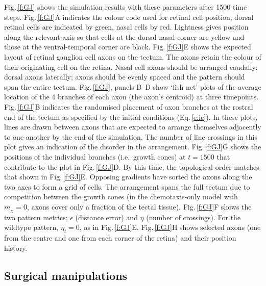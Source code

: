 \documentclass[11pt, a4paper]{article}
\begin{document}
Fig.\,\ref{f:GJ} shows the simulation results with these parameters after 1500 time steps. 
Fig.\,\ref{f:GJ}A indicates the colour code used for retinal cell position; dorsal retinal cells are indicated by green, nasal cells by red. Lightness gives position along the relevant axis so that cells at the dorsal-nasal corner are yellow and those at the ventral-temporal corner are black.
Fig.\,\ref{f:GJ}E shows the expected layout of retinal ganglion cell axons on the tectum.
The axons retain the colour of their originating cell on the retina.
Nasal cell axons should be arranged caudally; dorsal axons laterally; axons should be evenly spaced and the pattern should span the entire tectum.
Fig.\,\ref{f:GJ}, panels B--D show `fish net' plots of the average location of the 4 branches of each axon (the axon's centroid) at three timepoints. 
Fig.\,\ref{f:GJ}B indicates the randomised placement of axon branches at the rostral end of the tectum as specified by the initial conditions (Eq.\,\ref{e:ic}).
In these plots, lines are drawn between axons that are expected to arrange themselves adjacently to one another by the end of the simulation. 
The number of line crossings in this plot gives an indication of the disorder in the arrangement.
Fig.\,\ref{f:GJ}G shows the positions of the individual branches (i.e.~growth cones) at $t=1500$ that contribute to the plot in Fig.\,\ref{f:GJ}D.
By this time, the topological order matches that shown in Fig.\,\ref{f:GJ}E.
Opposing gradients have sorted the axons along the two axes to form a grid of cells.
The arrangement spans the full tectum due to competition between the growth cones (in the chemotaxis-only model with $m_{\!_X}=0$, axons cover only a fraction of the tectal tissue).
Fig.\,\ref{f:GJ}F shows the two pattern metrics; $\epsilon$ (distance error) and $\eta$ (number of crossings).
For the wildtype pattern, $\eta_t=0$, as in Fig.\,\ref{f:GJ}E. 
Fig.\,\ref{f:GJ}H shows selected axons (one from the centre and one from each corner of the retina) and their position history.

\subsection*{Surgical manipulations}
\end{document}
